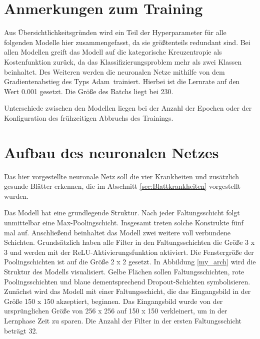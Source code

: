 \section{Anmerkungen zum Training}

Aus Übersichtlichkeitsgründen wird ein Teil der Hyperparameter für alle folgenden Modelle hier zusammengefasst, da sie größtenteils redundant sind. Bei allen Modellen greift das Modell auf die kategorische Kreuzentropie als Kostenfunktion zurück, da das Klassifizierungsproblem mehr als zwei Klassen beinhaltet. Des Weiteren werden die neuronalen Netze mithilfe von dem Gradientenabstieg des Typs \glqq Adam\grqq~trainiert. Hierbei ist die Lernrate auf den Wert 0.001 gesetzt. Die Größe des Batchs liegt bei 230. 

Unterschiede zwischen den Modellen liegen bei der Anzahl der Epochen oder der Konfiguration des frühzeitigen Abbruchs des Trainings.

\section{Aufbau des neuronalen Netzes}
\label{sec:customNN}

Das hier vorgestellte neuronale Netz soll die vier Krankheiten und zusätzlich gesunde Blätter erkennen, die im Abschnitt \ref{sec:Blattkrankheiten} vorgestellt wurden.  

Das Modell hat eine grundlegende Struktur. Nach jeder Faltungsschicht folgt unmittelbar eine Max-Poolingschicht. Insgesamt treten solche Konstrukte fünf mal auf. Anschließend beinhaltet das Modell zwei weitere voll verbundene Schichten. Grundsätzlich haben alle Filter in den Faltungsschichten die Größe 3 x 3 und werden mit der ReLU-Aktivierungsfunktion aktiviert. Die Fenstergröße der Poolingschichten ist auf die Größe 2 x 2 gesetzt.
In Abbildung \ref{my_arch} wird die Struktur des Modells visualisiert. Gelbe Flächen sollen Faltungsschichten, rote Poolingsschichten und blaue dementsprechend Dropout-Schichten symbolisieren. Zunächst wird das Modell mit einer Faltungsschicht, die das Eingangsbild in der Größe 150 x 150 akzeptiert, beginnen. Das Eingangsbild wurde von der ursprünglichen Größe von 256 x 256 auf 150 x 150 verkleinert, um in der Lernphase Zeit zu sparen. Die Anzahl der Filter in der ersten Faltungsschicht beträgt 32.

